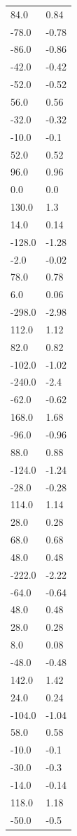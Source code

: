 \begin{longtable}{ll}
84.0 & 0.84 \\
-78.0 & -0.78 \\
-86.0 & -0.86 \\
-42.0 & -0.42 \\
-52.0 & -0.52 \\
56.0 & 0.56 \\
-32.0 & -0.32 \\
-10.0 & -0.1 \\
52.0 & 0.52 \\
96.0 & 0.96 \\
0.0 & 0.0 \\
130.0 & 1.3 \\
14.0 & 0.14 \\
-128.0 & -1.28 \\
-2.0 & -0.02 \\
78.0 & 0.78 \\
6.0 & 0.06 \\
-298.0 & -2.98 \\
112.0 & 1.12 \\
82.0 & 0.82 \\
-102.0 & -1.02 \\
-240.0 & -2.4 \\
-62.0 & -0.62 \\
168.0 & 1.68 \\
-96.0 & -0.96 \\
88.0 & 0.88 \\
-124.0 & -1.24 \\
-28.0 & -0.28 \\
114.0 & 1.14 \\
28.0 & 0.28 \\
68.0 & 0.68 \\
48.0 & 0.48 \\
-222.0 & -2.22 \\
-64.0 & -0.64 \\
48.0 & 0.48 \\
28.0 & 0.28 \\
8.0 & 0.08 \\
-48.0 & -0.48 \\
142.0 & 1.42 \\
24.0 & 0.24 \\
-104.0 & -1.04 \\
58.0 & 0.58 \\
-10.0 & -0.1 \\
-30.0 & -0.3 \\
-14.0 & -0.14 \\
118.0 & 1.18 \\
-50.0 & -0.5 \\

\end{longtable}

